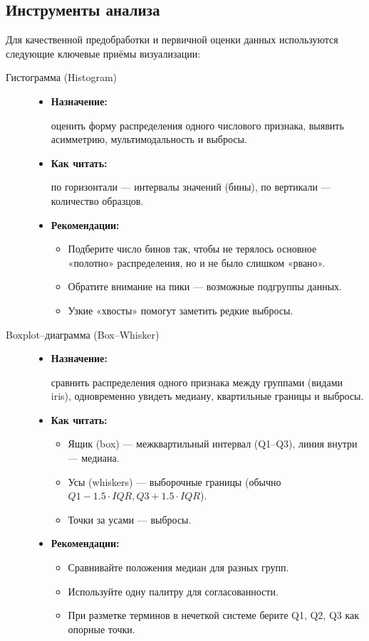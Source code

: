\subsection{Инструменты анализа}

Для качественной предобработки и первичной оценки данных используются следующие ключевые приёмы визуализации:

\begin{description}
  \item[Гистограмма (Histogram)]  
    \hfill 
    \begin{itemize}
      \item \textbf{Назначение:} 
        
        оценить форму распределения одного числового признака, выявить асимметрию, мультимодальность и выбросы.
      \item \textbf{Как читать:} 
        
        по горизонтали — интервалы значений (бины), по вертикали — количество образцов.  
      \item \textbf{Рекомендации:}  
        \begin{itemize}
          \item Подберите число бинов так, чтобы не терялось основное «полотно» распределения, но и не было слишком «рвано».  
          \item Обратите внимание на пики — возможные подгруппы данных.  
          \item Узкие «хвосты» помогут заметить редкие выбросы.
        \end{itemize} 
    \end{itemize}

  \item[Boxplot–диаграмма (Box–Whisker)]  
    \hfill
    \begin{itemize}
      \item \textbf{Назначение:} 
        
        сравнить распределения одного признака между группами (видами iris), одновременно увидеть медиану, квартильные границы и выбросы.
      \item \textbf{Как читать:}  
        \begin{itemize}
          \item Ящик (box) — межквартильный интервал (Q1–Q3), линия внутри — медиана.  
          \item Усы (whiskers) — выборочные границы (обычно $Q1-1.5 \cdot IQR, Q3+1.5 \cdot IQR$).  
          \item Точки за усами — выбросы.
        \end{itemize}
      \item \textbf{Рекомендации:}  
        \begin{itemize}
          \item Сравнивайте положения медиан для разных групп.  
          \item Используйте одну палитру для согласованности.  
          \item При разметке терминов в нечеткой системе берите Q1, Q2, Q3 как опорные точки.
        \end{itemize}
    \end{itemize}


\end{description}
